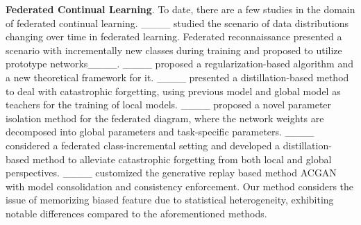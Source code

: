 \textbf{Federated Continual Learning}.
To date, there are a few studies in the domain of federated continual learning.
____ studied the scenario of data distributions changing over time in federated learning.
Federated reconnaissance presented a scenario with incrementally new classes during training and proposed to utilize prototype networks____.
____ proposed a regularization-based algorithm and a new theoretical framework for it.
____ presented a distillation-based method to deal with catastrophic forgetting, using previous model and global model as teachers for the training of local models.
____ proposed a novel parameter isolation method for the federated diagram, where the network weights are decomposed into global parameters and task-specific parameters.
____ considered a federated class-incremental setting and developed a distillation-based method to alleviate catastrophic forgetting from both local and global perspectives.
____ customized the generative replay based method ACGAN with model consolidation and consistency enforcement.
Our method considers the issue of memorizing biased feature due to statistical heterogeneity, exhibiting notable differences compared to the aforementioned methods.



%